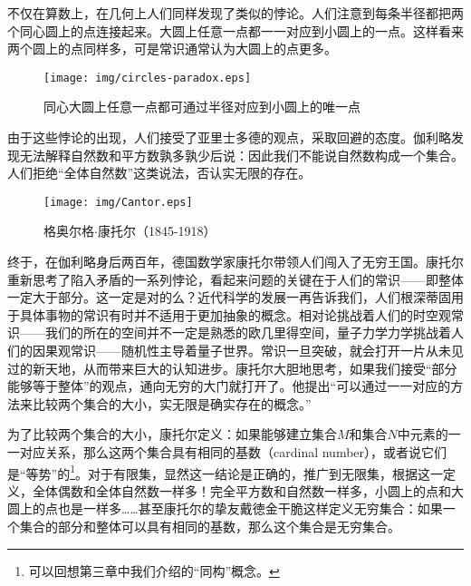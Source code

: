 \documentclass{article}
\begin{document}
不仅在算数上，在几何上人们同样发现了类似的悖论。人们注意到每条半径都把两个同心圆上的点连接起来。大圆上任意一点都一一对应到小圆上的一点。这样看来两个圆上的点同样多，可是常识通常认为大圆上的点更多。

\begin{figure}[htbp]
 \centering
 \texttt{[image: img/circles-paradox.eps]}
 \caption{同心大圆上任意一点都可通过半径对应到小圆上的唯一点}
 \label{fig:circles-paradox}
\end{figure}

由于这些悖论的出现，人们接受了亚里士多德的观点，采取回避的态度。伽利略发现无法解释自然数和平方数孰多孰少后说：因此我们不能说自然数构成一个集合。人们拒绝“全体自然数”这类说法，否认实无限的存在。

\begin{wrapfigure}{R}{0.4\textwidth}
 \centering
 \texttt{[image: img/Cantor.eps]}
 \captionsetup{labelformat=empty}
 \caption{格奥尔格$\cdot$康托尔（1845-1918）}
 \label{fig:Cantor}
\end{wrapfigure}

终于，在伽利略身后两百年，德国数学家康托尔带领人们闯入了无穷王国。康托尔重新思考了陷入矛盾的一系列悖论，看起来问题的关键在于人们的常识——即整体一定大于部分。这一定是对的么？近代科学的发展一再告诉我们，人们根深蒂固用于具体事物的常识有时并不适用于更加抽象的概念。相对论挑战着人们的时空观常识——我们的所在的空间并不一定是熟悉的欧几里得空间，量子力学力学挑战着人们的因果观常识——随机性主导着量子世界。常识一旦突破，就会打开一片从未见过的新天地，从而带来巨大的认知进步。康托尔大胆地思考，如果我们接受“部分能够等于整体”的观点，通向无穷的大门就打开了。他提出“可以通过一一对应的方法来比较两个集合的大小，实无限是确实存在的概念。”

为了比较两个集合的大小，康托尔定义：如果能够建立集合$M$和集合$N$中元素的一一对应关系，那么这两个集合具有相同的基数（cardinal number），或者说它们是“等势”的\footnote{可以回想第三章中我们介绍的“同构”概念。}。对于有限集，显然这一结论是正确的，推广到无限集，根据这一定义，全体偶数和全体自然数一样多！完全平方数和自然数一样多，小圆上的点和大圆上的点也是一样多……甚至康托尔的挚友戴徳金干脆这样定义无穷集合：如果一个集合的部分和整体可以具有相同的基数，那么这个集合是无穷集合。

\end{document}
